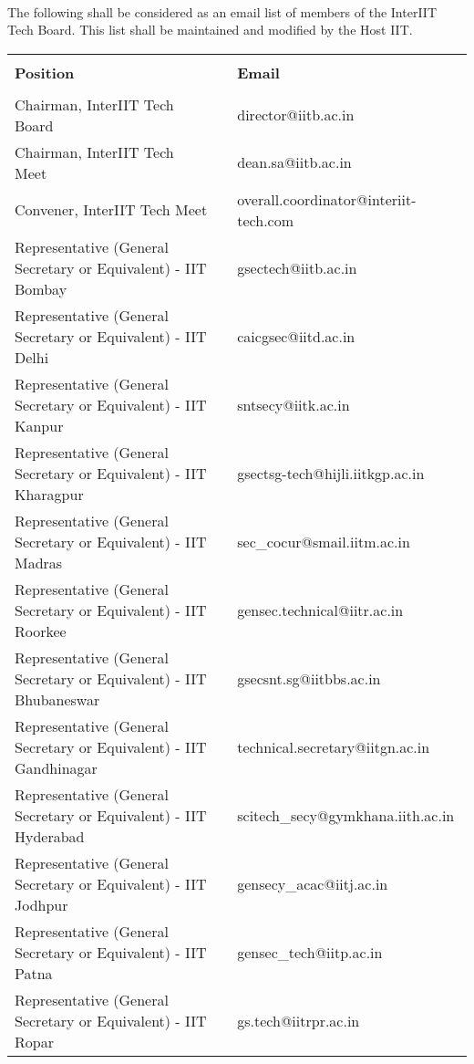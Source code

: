 \paragraph{}
The following shall be considered as an email list of members of the InterIIT Tech Board. This list shall be maintained and modified by the Host IIT.
\vspace{-10pt}
\begin{center}
\begin{longtable}{m{7cm} p{0.5cm} m{7cm}}
\hline
\\[-4pt]
\textbf{Position} & & \textbf{Email}  \\[4pt]
\hline
\\[-2pt]
Chairman, InterIIT Tech Board & &
director@iitb.ac.in \\
Chairman, InterIIT Tech Meet& &
dean.sa@iitb.ac.in\\
Convener, InterIIT Tech Meet& &
overall.coordinator@interiit-tech.com\\
Representative (General Secretary or Equivalent) - IIT Bombay& &
gsectech@iitb.ac.in\\
Representative (General Secretary or Equivalent) - IIT Delhi& &
caicgsec@iitd.ac.in\\
Representative (General Secretary or Equivalent) - IIT Kanpur& &
sntsecy@iitk.ac.in\\
Representative (General Secretary or Equivalent) - IIT Kharagpur& &
gsectsg-tech@hijli.iitkgp.ac.in\\
Representative (General Secretary or Equivalent) - IIT Madras& &
sec\_cocur@smail.iitm.ac.in\\
Representative (General Secretary or Equivalent) - IIT Roorkee& &
gensec.technical@iitr.ac.in\\
Representative (General Secretary or Equivalent) - IIT Bhubaneswar& &
gsecsnt.sg@iitbbs.ac.in  \\
Representative (General Secretary or Equivalent) - IIT Gandhinagar& &
technical.secretary@iitgn.ac.in\\
Representative (General Secretary or Equivalent) - IIT Hyderabad& &
scitech\_secy@gymkhana.iith.ac.in\\
Representative (General Secretary or Equivalent) - IIT Jodhpur& &
gensecy\_acac@iitj.ac.in\\
Representative (General Secretary or Equivalent) - IIT Patna& &
gensec\_tech@iitp.ac.in\\
Representative (General Secretary or Equivalent) - IIT Ropar& &
gs.tech@iitrpr.ac.in\\

\end{longtable}
\end{center}
